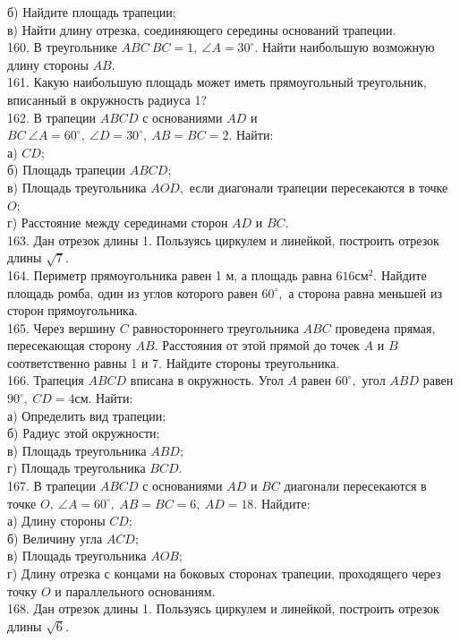 \documentclass[12pt]{article}
\begin{document}
б) Найдите площадь трапеции;\\
в) Найти длину отрезка, соединяющего середины оснований трапеции.\\
160. В треугольнике $ABC\ BC=1,\ \angle A=30^\circ.$ Найти наибольшую возможную длину стороны $AB.$\\
161. Какую наибольшую площадь может иметь прямоугольный треугольник, вписанный в окружность радиуса 1?\\
162. В трапеции $ABCD$ с основаниями $AD$ и $BC\ \angle A=60^\circ,\ \angle D=30^\circ,\ AB=BC=2.$ Найти:\\
а) $CD;$\\
б) Площадь трапеции $ABCD;$\\
в) Площадь треугольника $AOD,$ если диагонали трапеции пересекаются в точке $O;$\\
г) Расстояние между серединами сторон $AD$ и $BC.$\\
163. Дан отрезок длины 1. Пользуясь циркулем и линейкой, построить отрезок длины $\sqrt{7}.$\\
164. Периметр прямоугольника равен 1 м, а площадь равна $616\text{см}^2.$ Найдите площадь ромба, один из углов которого равен $60^\circ,$ а сторона равна меньшей из сторон прямоугольника.\\
165. Через вершину $C$ равностороннего треугольника $ABC$ проведена прямая, пересекающая сторону $AB.$ Расстояния от этой прямой до точек $A$ и $B$ соответственно равны 1 и 7. Найдите стороны треугольника.\\
166. Трапеция $ABCD$ вписана в окружность. Угол $A$ равен $60^\circ,$ угол $ABD$ равен $90^\circ,\ CD=4$см. Найти:\\
а) Определить вид трапеции;\\
б) Радиус этой окружности;\\
в) Площадь треугольника $ABD;$\\
г) Площадь треугольника $BCD.$\\
167. В трапеции $ABCD$ с основаниями $AD$ и $BC$ диагонали пересекаются в точке $O,\ \angle A=60^\circ,\ AB=BC=6,\ AD=18.$ Найдите:\\
а) Длину стороны $CD;$\\
б) Величину угла $ACD;$\\
в) Площадь треугольника $AOB;$\\
г) Длину отрезка с концами на боковых сторонах трапеции, проходящего через точку $O$ и параллельного основаниям.\\
168. Дан отрезок длины 1. Пользуясь циркулем и линейкой, построить отрезок длины $\sqrt{6}.$\\
\end{document}
